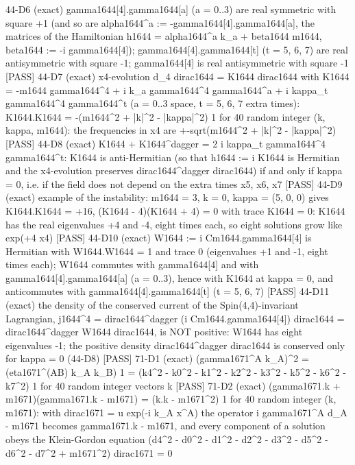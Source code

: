 \documentclass[
  10pt,
]{article}
\newenvironment{Shaded}{}{}
\newcommand{\NormalTok}[1]{#1}
\begin{document}
\begin{Shaded}
\begin{Highlighting}[]
\NormalTok{[PASS] 44{-}D6  (exact) gamma1644[4].gamma1644[a] (a = 0..3) are real symmetric with square +1 (and so are alpha1644\^{}a := {-}gamma1644[4].gamma1644[a], the matrices of the Hamiltonian h1644 = alpha1644\^{}a k\_a + beta1644 m1644, beta1644 := {-}i gamma1644[4]); gamma1644[4].gamma1644[t] (t = 5, 6, 7) are real antisymmetric with square {-}1; gamma1644[4] is real antisymmetric with square {-}1}
\NormalTok{[PASS] 44{-}D7  (exact) x4{-}evolution d\_4 dirac1644 = K1644 dirac1644 with K1644 = {-}m1644 gamma1644\^{}4 + i k\_a gamma1644\^{}4 gamma1644\^{}a + i kappa\_t gamma1644\^{}4 gamma1644\^{}t (a = 0..3 space, t = 5, 6, 7 extra times): K1644.K1644 = {-}(m1644\^{}2 + |k|\^{}2 {-} |kappa|\^{}2) 1 for 40 random integer (k, kappa, m1644): the frequencies in x4 are +{-}sqrt(m1644\^{}2 + |k|\^{}2 {-} |kappa|\^{}2)}
\NormalTok{[PASS] 44{-}D8  (exact) K1644 + K1644\^{}dagger = 2 i kappa\_t gamma1644\^{}4 gamma1644\^{}t: K1644 is anti{-}Hermitian (so that h1644 := i K1644 is Hermitian and the x4{-}evolution preserves dirac1644\^{}dagger dirac1644) if and only if kappa = 0, i.e. if the field does not depend on the extra times x5, x6, x7}
\NormalTok{[PASS] 44{-}D9  (exact) example of the instability: m1644 = 3, k = 0, kappa = (5, 0, 0) gives K1644.K1644 = +16, (K1644 {-} 4)(K1644 + 4) = 0 with trace K1644 = 0: K1644 has the real eigenvalues +4 and {-}4, eight times each, so eight solutions grow like exp(+4 x4)}
\NormalTok{[PASS] 44{-}D10  (exact) W1644 := i Cm1644.gamma1644[4] is Hermitian with W1644.W1644 = 1 and trace 0 (eigenvalues +1 and {-}1, eight times each); W1644 commutes with gamma1644[4] and with gamma1644[4].gamma1644[a] (a = 0..3), hence with K1644 at kappa = 0, and anticommutes with gamma1644[4].gamma1644[t] (t = 5, 6, 7)}
\NormalTok{[PASS] 44{-}D11  (exact) the density of the conserved current of the Spin(4,4){-}invariant Lagrangian, j1644\^{}4 = dirac1644\^{}dagger (i Cm1644.gamma1644[4]) dirac1644 = dirac1644\^{}dagger W1644 dirac1644, is NOT positive: W1644 has eight eigenvalues {-}1; the positive density dirac1644\^{}dagger dirac1644 is conserved only for kappa = 0 (44{-}D8)}
\NormalTok{[PASS] 71{-}D1  (exact) (gamma1671\^{}A k\_A)\^{}2 = (eta1671\^{}(AB) k\_A k\_B) 1 = (k4\^{}2 {-} k0\^{}2 {-} k1\^{}2 {-} k2\^{}2 {-} k3\^{}2 {-} k5\^{}2 {-} k6\^{}2 {-} k7\^{}2) 1 for 40 random integer vectors k}
\NormalTok{[PASS] 71{-}D2  (exact) (gamma1671.k + m1671)(gamma1671.k {-} m1671) = (k.k {-} m1671\^{}2) 1 for 40 random integer (k, m1671): with dirac1671 = u exp({-}i k\_A x\^{}A) the operator i gamma1671\^{}A d\_A {-} m1671 becomes gamma1671.k {-} m1671, and every component of a solution obeys the Klein{-}Gordon equation (d4\^{}2 {-} d0\^{}2 {-} d1\^{}2 {-} d2\^{}2 {-} d3\^{}2 {-} d5\^{}2 {-} d6\^{}2 {-} d7\^{}2 + m1671\^{}2) dirac1671 = 0}

\end{Highlighting}
\end{Shaded}
\end{document}

